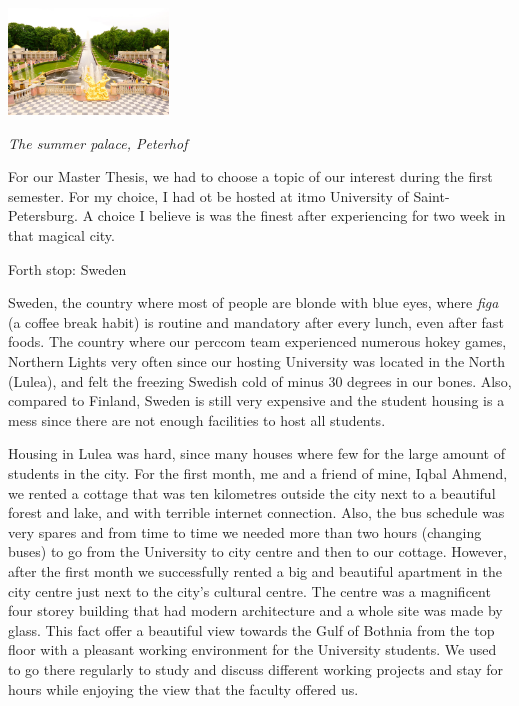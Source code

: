 \documentclass[10pt,a4paper]{article} %
\newcommand{\NewsItem}[1]{ %
\usefont{T1}{fvs}{n}{n} %
\vspace{24pt}\large #1\vspace{3pt} %
\par \normalsize \normalfont}
\begin{document}
\begin{multicols}{3}
 
\begin{center}
	\includegraphics[width=0.32\textwidth]{media/petergof.jpg}
	\par\textit{The summer palace, Peterhof}
\end{center}


For our Master Thesis, we had to choose a topic of our interest during the first 
semester. 
For my choice, I had ot be hosted at {\sc itmo} University of Saint-Petersburg. 
A choice I believe is was the finest after experiencing for two week in that 
magical city.


\NewsItem{Forth stop: Sweden}

Sweden, the country where most of people are blonde with blue eyes, 
where \textit{figa} (a coffee break habit) is routine and mandatory 
after every lunch, even after fast foods. 
The country where our {\sc perccom} team experienced numerous hokey games, Northern 
Lights very often since our hosting University was located in the North (Lulea), and 
felt the freezing Swedish cold of minus 30 degrees in our bones. 
Also, compared to Finland, Sweden is still very expensive and the student housing is 
a mess since there are not enough facilities to host all students. 


Housing in Lulea was hard, since many houses where few for the large amount of 
students in the city. 
For the first month, me and a friend of mine, Iqbal Ahmend, we rented a cottage 
that was ten kilometres outside the city next to a beautiful forest and lake, and 
with terrible internet connection. 
Also, the bus schedule was very spares and from time to time we needed more than two 
hours (changing buses) to go from the University to city centre and then to our 
cottage. 
However, after the first month we successfully rented a big and beautiful apartment 
in the city centre just next to the city's cultural centre. 
The centre was a magnificent four storey building that had modern architecture and 
a whole site was made by glass. 
This fact offer a beautiful view towards the Gulf of Bothnia from the top floor with 
a pleasant working environment for the University students. 
We used to go there regularly to study and discuss different working projects and 
stay for hours while enjoying the view that the faculty offered us.



\end{multicols}
\end{document}
